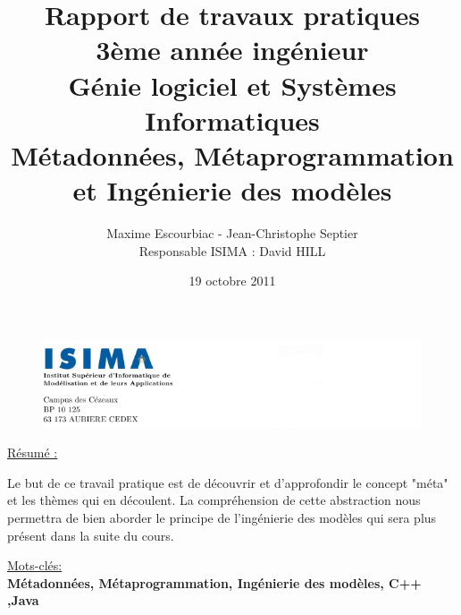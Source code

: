 \documentclass[a4paper,11pt]{report}
\begin{document}
\begin{figure}
   \includegraphics[scale = 0.75]{HeaderPagedeGarde.PNG}
\end{figure}


\author{Maxime Escourbiac - Jean-Christophe Septier \\ Responsable ISIMA : David HILL}
\title{
   Rapport de travaux pratiques \\ 3ème année ingénieur \\ Génie logiciel et Systèmes Informatiques \\
  \bigskip
   \large{
      Métadonnées, Métaprogrammation et Ingénierie des modèles
   }
}
\date{19 octobre 2011}
\maketitle

\newpage



\begin{flushleft}
\LARGE{ \underline {Résumé :}\bigskip}
\end{flushleft}

\normalsize{
Le but de ce travail pratique est de découvrir et d'approfondir le concept "méta" et les thèmes qui en découlent. La compréhension de cette abstraction nous permettra de bien aborder le principe de l'ingénierie des modèles qui sera plus présent dans la suite du cours.
}

\begin{flushleft}
\large{ \underline {Mots-clés:}\bigskip}\\
{\bf  Métadonnées, Métaprogrammation, Ingénierie des modèles, C++ ,Java}
\end{flushleft}

\newpage


\tableofcontents
\newpage


\end{document}

